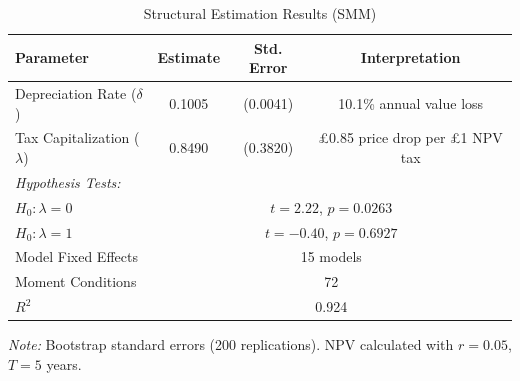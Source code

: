
\begin{table}[ht]
    \centering
    \caption{Structural Estimation Results (SMM)}
    \label{tab:smm_results}
    \begin{threeparttable}
    \begin{tabular}{lccc}
        \toprule
        Parameter & Estimate & Std. Error & Interpretation \\
        \midrule
        Depreciation Rate ($\delta$) & 0.1005 & (0.0041) & 10.1\% annual value loss \\
        Tax Capitalization ($\lambda$) & 0.8490 & (0.3820) & \pounds 0.85 price drop per \pounds 1 NPV tax \\
        \midrule
        \multicolumn{4}{l}{\textit{Hypothesis Tests:}} \\
        $H_0: \lambda = 0$ & \multicolumn{3}{c}{$t = 2.22$, $p = 0.0263$} \\
        $H_0: \lambda = 1$ & \multicolumn{3}{c}{$t = -0.40$, $p = 0.6927$} \\
        \midrule
        Model Fixed Effects & \multicolumn{3}{c}{15 models} \\
        Moment Conditions & \multicolumn{3}{c}{72} \\
        $R^2$ & \multicolumn{3}{c}{0.924} \\
        \bottomrule
    \end{tabular}
    \begin{tablenotes}
        \small
        \item \textit{Note:} Bootstrap standard errors (200 replications). NPV calculated with $r=0.05$, $T=5$ years.
    \end{tablenotes}
    \end{threeparttable}
\end{table}
